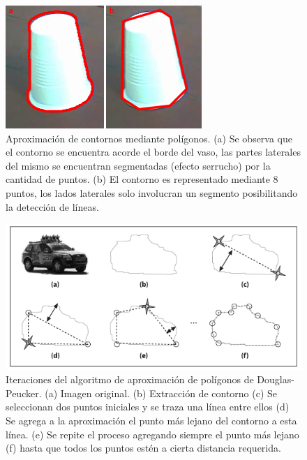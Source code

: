 \begin{figure}[htpb]
\begin{center}
  \includegraphics[scale=0.8]{vision/figures/polyaprox.png}
\end{center}
  \caption[Aproximaci\'on de contornos mediante pol\'igonos]{\small Aproximaci\'on de contornos mediante pol\'igonos. (a) Se observa que el contorno se encuentra acorde el borde del vaso, las
  partes laterales del mismo se encuentran segmentadas (efecto serrucho) por la cantidad de puntos. (b) El contorno es representado mediante
  8 puntos, los lados laterales solo involucran un segmento posibilitando la detecci\'on de l\'ineas.}
  \label{fig:polyVasos}
\end{figure}

\begin{figure}[htpb]
\begin{center}
  \includegraphics[scale=0.6]{vision/figures/douglas-pecker.png}
\end{center}
  \caption[Algoritmo de aproximaci\'on de pol\'igonos]{\small Iteraciones del algoritmo de aproximaci\'on de pol\'igonos de Douglas-Peucker. (a) Imagen original. (b) Extracci\'on de contorno
  (c) Se seleccionan dos puntos iniciales y se traza una l\'inea entre ellos (d) Se agrega a la aproximaci\'on el punto m\'as lejano del contorno a esta l\'inea.
  (e) Se repite el proceso agregando siempre el punto m\'as lejano (f) hasta que todos los puntos est\'en a cierta distancia requerida.}
  \label{fig:polyaprox}
\end{figure}

